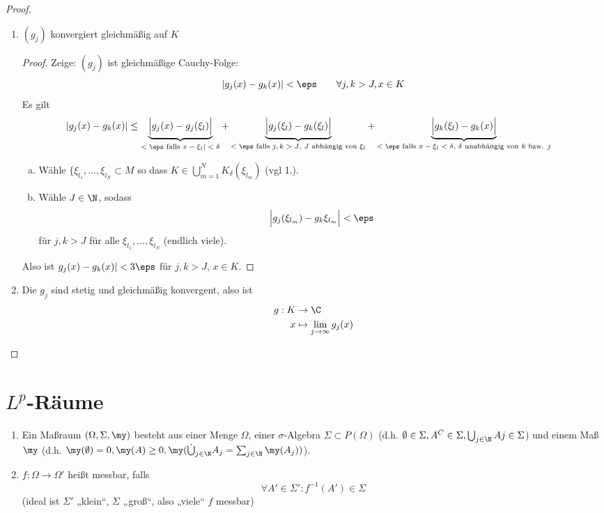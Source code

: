 \documentclass{mycourse}
\begin{document}
\begin{st}
\begin{proof}
\begin{enumerate}[1)]
\begin{proof}
					Dann ist $(g_j)$ Teilfolge von $(f_j^{(k)})$ und $(g_j(\xi_k))$ konvergent für alle $\xi_k \in M$.
				\end{proof}
			\item
				$(g_j)$ konvergiert gleichmäßig auf $K$
				\begin{proof}
					Zeige: $(g_j)$ ist gleichmäßige Cauchy-Folge:
					\[
						|g_j(x) - g_k(x)| < \eps
						\qquad \forall j,k > J, x \in K
					\]
					Es gilt
					\begin{align*}
						|g_j(x) - g_k(x)| 
						&\le \underbrace{\Big|g_j(x)-g_j(\xi_l)\Big|}_{\text{$< \eps$ falls $x-\xi_l|<\delta$}} 
						+ \underbrace{\Big|g_j(\xi_l) - g_k(\xi_l)\Big|}_{\text{$<\eps$ falls $j,k > J$, $J$ abhängig von $\xi_l$}}  + \underbrace{\Big| g_k(\xi_l) - g_k(x)\Big|}_{\text{$<\eps$ falls $x-\xi_l < \delta$, $\delta$ unabhängig von $k$ bzw. $j$}} 
					\end{align*}
					\begin{enumerate}[a)]
						\item
							Wähle $\{\xi_{l_1}, \dotsc, \xi_{l_N} \subset M$ so dass $K \in \bigcup_{m=1}^N K_\delta (\xi_{l_m})$ (vgl 1.).
						\item
							Wähle $J \in \N$, sodass 
							\[
								\Big| g_j(\xi_{l_m}) - g_k{\xi_{l_m}} \Big| < \eps
							\]
							für $j,k > J$ für alle $\xi_{l_1}, \dotsc, \xi_{l_N}$ (endlich viele).
					\end{enumerate}
					Also ist $g_j(x) - g_k(x)| < 3 \eps$ für $j,k > J$, $x\in K$.
				\end{proof}
			\item
				Die $g_j$ sind stetig und gleichmäßig konvergent, also ist
				\begin{align*}
					g: K &\to \C \\
					x &\mapsto \lim_{j\to \infty} g_j(x)
				\end{align*}
		\end{enumerate}
	\end{proof}
\end{st}



\chapter{\texorpdfstring{$L^p$}{Lp}-Räume}


\begin{df} \label{2.1}
	\begin{enumerate}[1)]
		\item
			Ein Maßraum $(\Omega, \Sigma, \my)$ besteht aus einer Menge $\Omega$, einer $\sigma$-Algebra $\Sigma \subset P(\Omega)$ (d.h. $\emptyset \in \Sigma, A^C \in \Sigma, \bigcup_{j\in \N} Aj \in \Sigma$) und einem Maß $\my$ (d.h. $\my(\emptyset) = 0, \my(A) \ge 0, \my(\dot\bigcup_{j\in \N}A_j = \sum_{j\in \N} \my(A_j))$).
		\item
			$f: \Omega \to \Omega'$ heißt messbar, falls
			\[
				\forall A' \in \Sigma' : f^{-1}(A') \in \Sigma
			\]
			(ideal ist $\Sigma'$ „klein“, $\Sigma$ „groß“, also „viele“ $f$ messbar)
	\end{enumerate}
\end{df}
\end{document}
